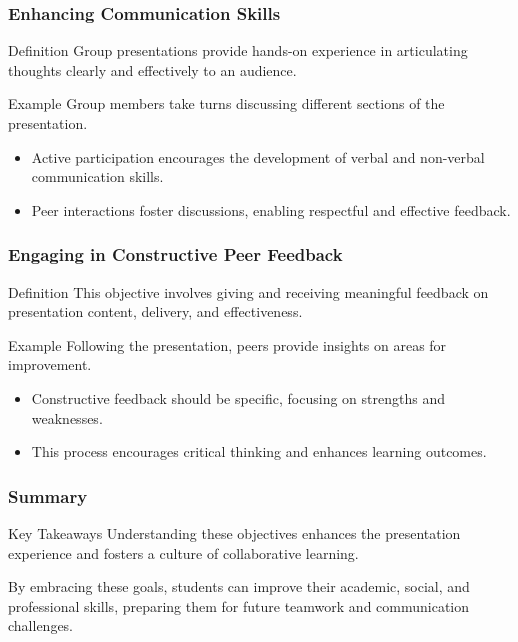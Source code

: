 \documentclass[aspectratio=169]{beamer}
\begin{document}
\begin{frame}[fragile]
    \frametitle{Enhancing Communication Skills}
    \begin{block}{Definition}
        Group presentations provide hands-on experience in articulating thoughts clearly and effectively to an audience.
    \end{block}
    \begin{exampleblock}{Example}
        Group members take turns discussing different sections of the presentation.
    \end{exampleblock}
    \begin{itemize}
        \item Active participation encourages the development of verbal and non-verbal communication skills.
        \item Peer interactions foster discussions, enabling respectful and effective feedback.
    \end{itemize}
\end{frame}

\begin{frame}[fragile]
    \frametitle{Engaging in Constructive Peer Feedback}
    \begin{block}{Definition}
        This objective involves giving and receiving meaningful feedback on presentation content, delivery, and effectiveness.
    \end{block}
    \begin{exampleblock}{Example}
        Following the presentation, peers provide insights on areas for improvement.
    \end{exampleblock}
    \begin{itemize}
        \item Constructive feedback should be specific, focusing on strengths and weaknesses.
        \item This process encourages critical thinking and enhances learning outcomes.
    \end{itemize}
\end{frame}

\begin{frame}[fragile]
    \frametitle{Summary}
    \begin{block}{Key Takeaways}
        Understanding these objectives enhances the presentation experience and fosters a culture of collaborative learning.
    \end{block}
    By embracing these goals, students can improve their academic, social, and professional skills, preparing them for future teamwork and communication challenges.
\end{frame}
\end{document}
